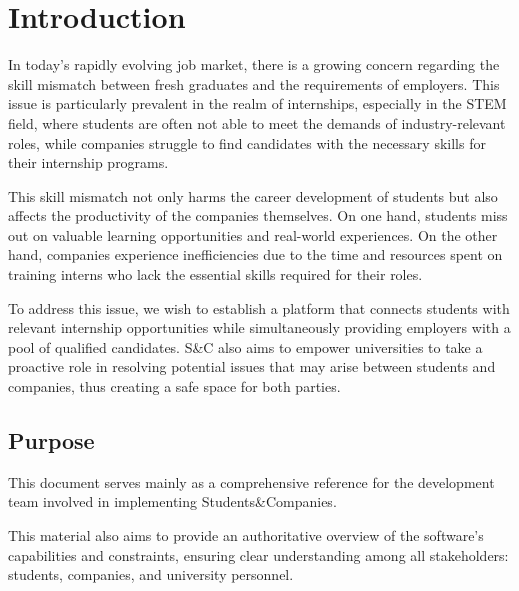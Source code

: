 \chapter{Introduction}
\label{ch:introduction}%

\par In today's rapidly evolving job market, there is a growing concern regarding the skill mismatch between fresh
graduates and the requirements of employers. This issue is particularly prevalent in the realm of internships,
especially in the STEM field, where students are often not able to meet the demands of industry-relevant roles, while
companies struggle to find candidates with the necessary skills for their internship programs.

\par This skill mismatch not only harms the career development of students but also affects the productivity of the
companies themselves. On one hand, students miss out on valuable learning opportunities and real-world experiences. On
the other hand, companies experience inefficiencies due to the time and resources spent on training interns who lack
the essential skills required for their roles.

\par To address this issue, we wish to establish a platform that connects students with relevant internship
opportunities while simultaneously providing employers with a pool of qualified candidates. S\&C also aims to empower
universities to take a proactive role in resolving potential issues that may arise between students and companies, thus
creating a safe space for both parties.

\section{Purpose}
\label{sec:purpose}%

\par This document serves mainly as a comprehensive reference for the development team involved in implementing
Students\&Companies.

\par This material also aims to provide an authoritative overview of the software's capabilities and constraints,
ensuring clear understanding among all stakeholders: students, companies, and university personnel.

\pagebreak

